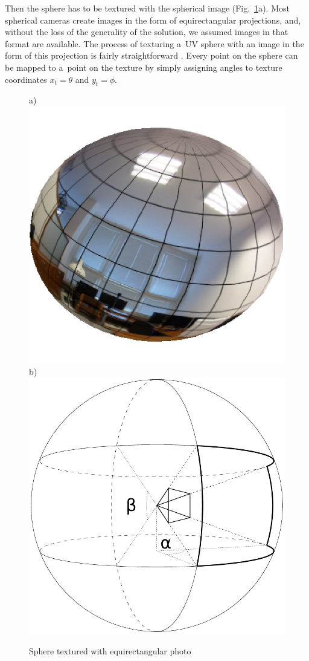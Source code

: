 \documentclass[conference]{ieeetran}
\begin{document}
Then the sphere has to be textured with the spherical image (Fig.~\ref{fig:spheresb}a).
Most spherical cameras create images in the form of equirectangular projections, and, without the loss
of the generality of the solution, we assumed images in that format are available.
The process of texturing a~UV sphere with an image in the form of this projection is fairly straightforward \cite{greene1986environment}. 
Every point on the sphere can be mapped to a~point on the texture by simply assigning angles to texture 
coordinates $x_t = \theta$ and $y_t = \phi$.

\begin{figure}[ht!]
    \centering
    a) \hspace{-3mm}\includegraphics[width=0.48\columnwidth]{img/gl_sphere/textured}
    b) \hspace{-3mm}\includegraphics[width=0.48\columnwidth]{img/sphere}
    \caption{Sphere textured with equirectangular photo}
    \label{fig:spheresb}
\end{figure}
\end{document}
